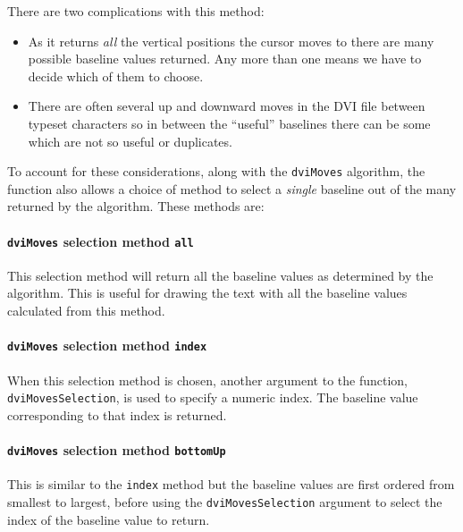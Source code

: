 \documentclass[]{article}
\let\oldparagraph\paragraph
\renewcommand{\paragraph}[1]{\oldparagraph{#1}\mbox{}}
\begin{document}
There are two complications with this method:

\begin{itemize}
\item
  As it returns \emph{all} the vertical positions the cursor moves to
  there are many possible baseline values returned. Any more than one
  means we have to decide which of them to choose.
\item
  There are often several up and downward moves in the DVI file between
  typeset characters so in between the ``useful'' baselines there can be
  some which are not so useful or duplicates.
\end{itemize}

To account for these considerations, along with the \texttt{dviMoves}
algorithm, the function also allows a choice of method to select a
\emph{single} baseline out of the many returned by the algorithm. These
methods are:

\paragraph{\texorpdfstring{\texttt{dviMoves} selection method
\texttt{all}}{dviMoves selection method all}}\label{dvimoves-selection-method-all}

This selection method will return all the baseline values as determined
by the algorithm. This is useful for drawing the text with all the
baseline values calculated from this method.

\paragraph{\texorpdfstring{\texttt{dviMoves} selection method
\texttt{index}}{dviMoves selection method index}}\label{dvimoves-selection-method-index}

When this selection method is chosen, another argument to the function,
\texttt{dviMovesSelection}, is used to specify a numeric index. The
baseline value corresponding to that index is returned.

\paragraph{\texorpdfstring{\texttt{dviMoves} selection method
\texttt{bottomUp}}{dviMoves selection method bottomUp}}\label{dvimoves-selection-method-bottomup}

This is similar to the \texttt{index} method but the baseline values are
first ordered from smallest to largest, before using the
\texttt{dviMovesSelection} argument to select the index of the baseline
value to return.
\end{document}
